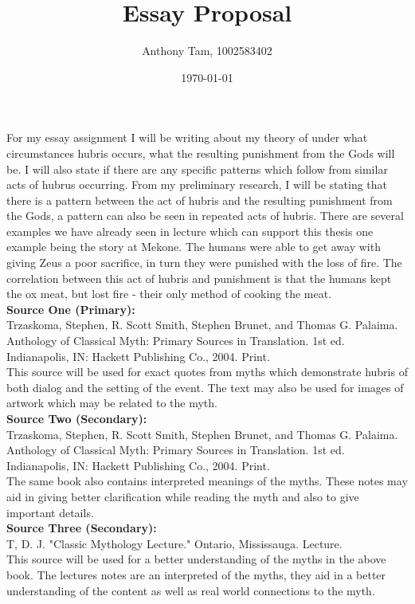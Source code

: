 \documentclass[11pt]{article}
\author{Anthony Tam, 1002583402}
\date{\today}
\title{Essay Proposal}
\begin{document}
\maketitle
For my essay assignment I will be writing about my theory of under what
circumstances hubris occurs, what the resulting punishment from the Gods will be.
I will also state if there are any specific patterns which follow from
similar acts of hubrus occurring. From my preliminary research, I will be
stating that there is a pattern between the act of hubris and the resulting
punishment from the Gods, a pattern can also be seen in repeated acts of
hubris. There are several examples we have already seen in lecture which
can support this thesis one example being the story at Mekone. The humans
were able to get away with giving Zeus a poor sacrifice, in turn they were
punished with the loss of fire. The correlation between this act of hubris
and punishment is that the humans kept the ox meat, but lost fire - their
only method of cooking the meat.\\

\textbf{Source One (Primary):}\\
Trzaskoma, Stephen, R. Scott Smith, Stephen Brunet, and Thomas G. Palaima.
Anthology of Classical Myth: Primary Sources in Translation. 1st ed.
Indianapolis, IN: Hackett Publishing Co., 2004. Print.\\

This source will be used for exact quotes from myths which demonstrate
hubris of both dialog and the setting of the event. The text may also be used
for images of artwork which may be related to the myth.\\

\textbf{Source Two (Secondary):}\\
Trzaskoma, Stephen, R. Scott Smith, Stephen Brunet, and Thomas G. Palaima.
Anthology of Classical Myth: Primary Sources in Translation. 1st ed.
Indianapolis, IN: Hackett Publishing Co., 2004. Print. \\

The same book also contains interpreted meanings of the myths. These notes
may aid in giving better clarification while reading the myth and also to give
important details.\\

\textbf{Source Three (Secondary):}\\
T, D. J. "Classic Mythology Lecture." Ontario, Mississauga. Lecture.\\

This source will be used for a better understanding of the myths in the
above book. The lectures notes are an interpreted of the myths, they
aid in a better understanding of the content as well as real world connections
to the myth.\\
\end{document}
